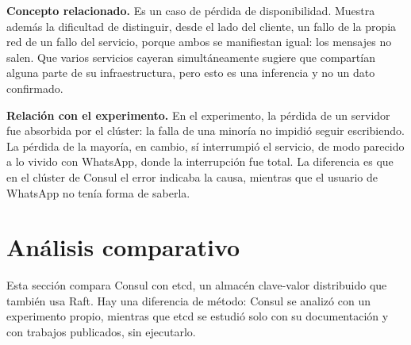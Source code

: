 \documentclass[12pt,a4paper]{article}
\begin{document}
\textbf{Concepto relacionado.} Es un caso de pérdida de disponibilidad. Muestra además la
dificultad de distinguir, desde el lado del cliente, un fallo de la propia red de un fallo del
servicio, porque ambos se manifiestan igual: los mensajes no salen. Que varios servicios
cayeran simultáneamente sugiere que compartían alguna parte de su infraestructura, pero esto es
una inferencia y no un dato confirmado. 

\textbf{Relación con el experimento.} En el experimento, la pérdida de un servidor fue
absorbida por el clúster: la falla de una minoría no impidió seguir escribiendo. La pérdida de
la mayoría, en cambio, sí interrumpió el servicio, de modo parecido a lo vivido con WhatsApp,
donde la interrupción fue total. La diferencia es que en el clúster de Consul el error
indicaba la causa, mientras que el usuario de WhatsApp no tenía forma de saberla.

\section{Análisis comparativo}

Esta sección compara Consul con etcd, un almacén clave-valor
distribuido que también usa Raft.
Hay una diferencia de método: Consul se analizó con un
experimento propio, mientras que etcd se estudió solo con
su documentación y con trabajos publicados, sin ejecutarlo.

\begingroup
\small
\setlength{\LTpre}{6pt}
\setlength{\LTpost}{6pt}
\setlength{\tabcolsep}{4pt}
\renewcommand{\arraystretch}{1.1}
\end{document}
